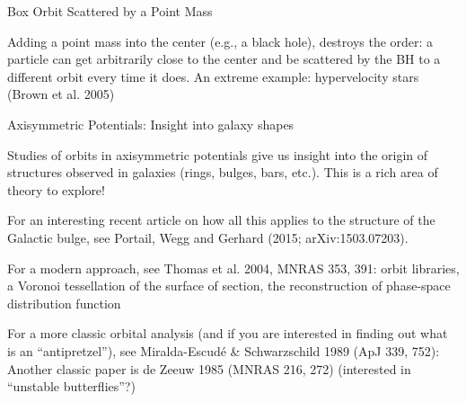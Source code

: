 \documentclass[letterpaper,landscape]{slides}
\begin{document}
\begin{slide}
\begin{center}
{\large \color{red} 
                    Box Orbit Scattered by a Point Mass  }
\end{center}

\begin{center}
\vskip 0.0in
\end{center}

Adding a point mass into the center (e.g., a black hole), destroys the
order: a particle can get arbitrarily close to the center
and be scattered by the BH to a different orbit every time it does.
An extreme example: hypervelocity stars (Brown et al. 2005)

\vfill
\end{slide}









\begin{slide}
\begin{center}
{\large \color{red} 
                       Axisymmetric Potentials: Insight into galaxy shapes   }
\end{center}

Studies of orbits in axisymmetric potentials give us insight into the origin
of structures observed in galaxies (rings, bulges, bars, etc.). This is a
rich area of theory to explore!

For an interesting recent article on how all this applies to the structure
of the Galactic bulge, see Portail, Wegg and Gerhard (2015; arXiv:1503.07203).

For a modern approach, see Thomas et al. 2004, MNRAS 353, 391: orbit
libraries, a Voronoi tessellation of the surface of section, the reconstruction
of phase-space distribution function

For a more classic orbital analysis (and if you are interested in finding
out what is an ``antipretzel''), see Miralda-Escud\'{e} \& Schwarzschild
1989 (ApJ 339, 752): Another classic paper is de Zeeuw 1985 (MNRAS 216, 272)
(interested in ``unstable butterflies''?)

\vfill
\end{slide}
\end{document}

